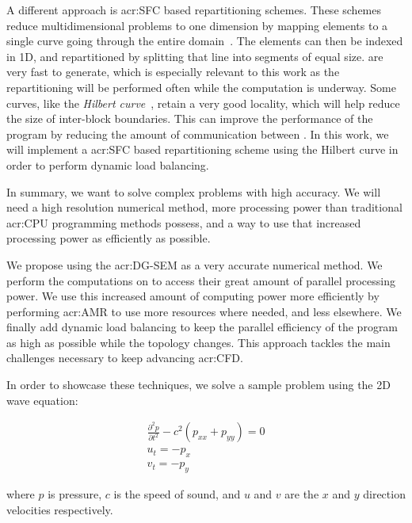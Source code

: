 A different approach is \acrfull{acr:SFC} based repartitioning schemes. These schemes reduce
multidimensional problems to one dimension by mapping elements to a single curve going through the
entire domain~\cite{Peano1890}. The elements can then be indexed in 1D, and repartitioned by
splitting that line into segments of equal size.  are very fast to generate,
which is especially relevant to this work as the repartitioning will be performed often while the
computation is underway. Some curves, like the \textit{Hilbert curve}~\cite{Hilbert1891}, retain a
very good locality, which will help reduce the size of inter-block boundaries. This can improve the
performance of the program by reducing the amount of communication between . In
this work, we will implement a \acrshort{acr:SFC} based repartitioning scheme using the Hilbert
curve in order to perform dynamic load balancing.

In summary, we want to solve complex problems with high accuracy. We will need a high resolution
numerical method, more processing power than traditional \acrshort{acr:CPU} programming methods
possess, and a way to use that increased processing power as efficiently as possible. 

We propose using the \acrlong{acr:DG-SEM} as a very accurate numerical method. We perform the
computations on  to access their great amount of parallel processing power. We
use this increased amount of computing power more efficiently by performing \acrlong{acr:AMR} to use
more resources where needed, and less elsewhere. We finally add dynamic load balancing to keep the
parallel efficiency of the program as high as possible while the topology changes. This approach
tackles the main challenges necessary to keep advancing \acrshort{acr:CFD}.

In order to showcase these techniques, we solve a sample problem using the 2D wave equation:

\begin{gather}
	\frac{\partial^2p}{\partial t^2} - c^2(p_{xx} + p_{yy}) = 0 \\
	u_t = - p_x \\
	v_t = -p_y
\end{gather}

\noindent
where \(p\) is pressure, \(c\) is the speed of sound, and \(u\) and \(v\) are the \(x\) and \(y\)
direction velocities respectively. 

